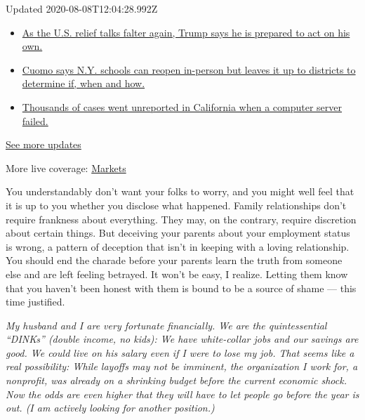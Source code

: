 Updated 2020-08-08T12:04:28.992Z

\begin{itemize}
\tightlist
\item
  \href{https://www.nytimes.com/2020/08/07/world/covid-19-news.html?action=click\&pgtype=Article\&state=default\&region=MAIN_CONTENT_1\&context=storylines_live_updates\#link-1f86d03a}{As
  the U.S. relief talks falter again, Trump says he is prepared to act
  on his own.}
\item
  \href{https://www.nytimes.com/2020/08/07/world/covid-19-news.html?action=click\&pgtype=Article\&state=default\&region=MAIN_CONTENT_1\&context=storylines_live_updates\#link-3f64a70a}{Cuomo
  says N.Y. schools can reopen in-person but leaves it up to districts
  to determine if, when and how.}
\item
  \href{https://www.nytimes.com/2020/08/07/world/covid-19-news.html?action=click\&pgtype=Article\&state=default\&region=MAIN_CONTENT_1\&context=storylines_live_updates\#link-14e70066}{Thousands
  of cases went unreported in California when a computer server failed.}
\end{itemize}

\href{https://www.nytimes.com/2020/08/07/world/covid-19-news.html?action=click\&pgtype=Article\&state=default\&region=MAIN_CONTENT_1\&context=storylines_live_updates}{See
more updates}

More live coverage:
\href{https://www.nytimes.com/live/2020/08/07/business/stock-market-today-coronavirus?action=click\&pgtype=Article\&state=default\&region=MAIN_CONTENT_1\&context=storylines_live_updates}{Markets}

You understandably don't want your folks to worry, and you might well
feel that it is up to you whether you disclose what happened. Family
relationships don't require frankness about everything. They may, on the
contrary, require discretion about certain things. But deceiving your
parents about your employment status is wrong, a pattern of deception
that isn't in keeping with a loving relationship. You should end the
charade before your parents learn the truth from someone else and are
left feeling betrayed. It won't be easy, I realize. Letting them know
that you haven't been honest with them is bound to be a source of shame
--- this time justified.

\emph{My husband and I are very fortunate financially. We are the
quintessential ``DINKs'' (double income, no kids): We have white-collar
jobs and our savings are good. We could live on his salary even if I
were to lose my job. That seems like a real possibility: While layoffs
may not be imminent, the organization I work for, a nonprofit, was
already on a shrinking budget before the current economic shock. Now the
odds are even higher that they will have to let people go before the
year is out. (I am actively looking for another position.)}

